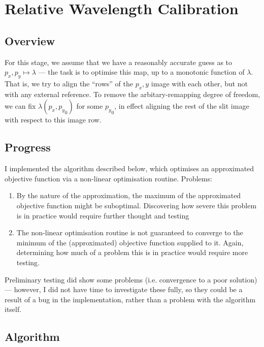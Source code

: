 \section{Relative Wavelength Calibration}
\label{sec:relativeWavelengthCalibration}

\subsection{Overview}

For this stage, we assume that we have a reasonably accurate guess as to
$p_x, p_y \mapsto \lambda$ --- the task is to optimise this map, up to a
monotonic function of $\lambda$. That is, we try to align the ``rows''
of the $p_x, y$ image with each other, but not with any external
reference. To remove the arbitary-remapping degree of freedom, we can
fix $\lambda(p_x, {p_y}_0)$ for some ${p_y}_0$, in effect aligning the
rest of the slit image with respect to this image row.

\subsection{Progress}

I implemented the algorithm described below, which optimises an
approximated objective function via a non-linear optimisation routine.
Problems:
\begin{enumerate}
\item By the nature of the approximation, the maximum of the
approximated objective function might be suboptimal. Discovering how
severe this problem is in practice would require further thought and
testing
\item The non-linear optimisation routine is not guaranteed to converge
to the minimum of the (approximated) objective function supplied to
it. Again, determining how much of a problem this is in practice would
require more testing.
\end{enumerate}
Preliminary testing did show some problems (i.e. convergence to a poor
solution) --- however, I did not have time to investigate these fully,
so they could be a result of a bug in the implementation, rather than
a problem with the algorithm itself.


\subsection{Algorithm}


